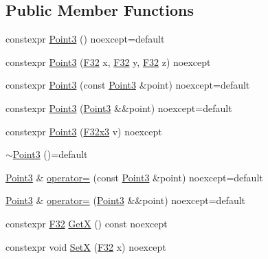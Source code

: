 \subsection*{Public Member Functions}
\begin{DoxyCompactItemize}
\item 
constexpr \mbox{\hyperlink{structmage_1_1_point3_a5615d9dddc6cedf47df9047fd23b7833}{Point3}} () noexcept=default
\item 
constexpr \mbox{\hyperlink{structmage_1_1_point3_ade2447542de93cfeeb7209cdfa3051e7}{Point3}} (\mbox{\hyperlink{namespacemage_aa97e833b45f06d60a0a9c4fc22ae02c0}{F32}} x, \mbox{\hyperlink{namespacemage_aa97e833b45f06d60a0a9c4fc22ae02c0}{F32}} y, \mbox{\hyperlink{namespacemage_aa97e833b45f06d60a0a9c4fc22ae02c0}{F32}} z) noexcept
\item 
constexpr \mbox{\hyperlink{structmage_1_1_point3_a1efeee54fe0401b52c90c8abe045ec37}{Point3}} (const \mbox{\hyperlink{structmage_1_1_point3}{Point3}} \&point) noexcept=default
\item 
constexpr \mbox{\hyperlink{structmage_1_1_point3_ae0c52aa09a4daec05a7b61eaed205866}{Point3}} (\mbox{\hyperlink{structmage_1_1_point3}{Point3}} \&\&point) noexcept=default
\item 
constexpr \mbox{\hyperlink{structmage_1_1_point3_ae92569a8f17984726f2d0a15ef183aa5}{Point3}} (\mbox{\hyperlink{namespacemage_a0fef5ab4e073c2d9ea876fefa3da4233}{F32x3}} v) noexcept
\item 
\mbox{\hyperlink{structmage_1_1_point3_a952151b6ff72b68569f95445c2ac2495}{$\sim$\+Point3}} ()=default
\item 
\mbox{\hyperlink{structmage_1_1_point3}{Point3}} \& \mbox{\hyperlink{structmage_1_1_point3_aaf94d246281f433cdbd1391bfedc55cb}{operator=}} (const \mbox{\hyperlink{structmage_1_1_point3}{Point3}} \&point) noexcept=default
\item 
\mbox{\hyperlink{structmage_1_1_point3}{Point3}} \& \mbox{\hyperlink{structmage_1_1_point3_a37ccf01cf7b610d4b17aa7a7888a443c}{operator=}} (\mbox{\hyperlink{structmage_1_1_point3}{Point3}} \&\&point) noexcept=default
\item 
constexpr \mbox{\hyperlink{namespacemage_aa97e833b45f06d60a0a9c4fc22ae02c0}{F32}} \mbox{\hyperlink{structmage_1_1_point3_a94373be88e1cf76819b1c458860299dd}{GetX}} () const noexcept
\item 
constexpr void \mbox{\hyperlink{structmage_1_1_point3_a62c79c14704a8f53e571d693aafa8471}{SetX}} (\mbox{\hyperlink{namespacemage_aa97e833b45f06d60a0a9c4fc22ae02c0}{F32}} x) noexcept

\end{DoxyCompactItemize}
